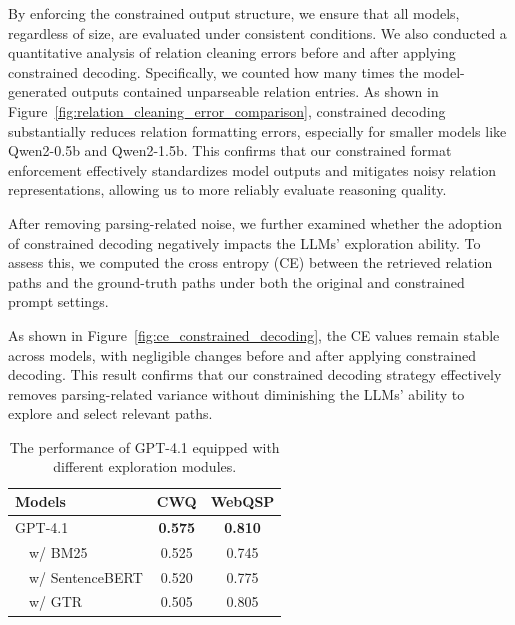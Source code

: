 \documentclass[11pt]{article}
\begin{document}
By enforcing the constrained output structure, we ensure that all models, regardless of size, are evaluated under consistent conditions. We also conducted a quantitative analysis of relation cleaning errors before and after applying constrained decoding. Specifically, we counted how many times the model-generated outputs contained unparseable relation entries. As shown in Figure~\ref{fig:relation_cleaning_error_comparison}, constrained decoding substantially reduces relation formatting errors, especially for smaller models like Qwen2-0.5b and Qwen2-1.5b. This confirms that our constrained format enforcement effectively standardizes model outputs and mitigates noisy relation representations, allowing us to more reliably evaluate reasoning quality.

After removing parsing-related noise, we further examined whether the adoption of constrained decoding negatively impacts the LLMs' exploration ability. To assess this, we computed the cross entropy (CE) between the retrieved relation paths and the ground-truth paths under both the original and constrained prompt settings. 

As shown in Figure~\ref{fig:ce_constrained_decoding}, the CE values remain stable across models, with negligible changes before and after applying constrained decoding. This result confirms that our constrained decoding strategy effectively removes parsing-related variance without diminishing the LLMs’ ability to explore and select relevant paths.

\begin{table}
  \centering
  \begin{tabular}{l|c|c}
    \hline
    Models & CWQ & WebQSP \\
    \hline
    GPT-4.1 & \textbf{0.575} & \textbf{0.810} \\
    $\quad$w/ BM25 & 0.525 & 0.745 \\
    $\quad$w/ SentenceBERT & 0.520 & 0.775 \\
    $\quad$w/ GTR & 0.505 & 0.805 \\ \hline
  \end{tabular}
    \caption{The performance of GPT-4.1 equipped with different exploration modules.}
\label{tab:llm_retrieval}
\end{table}
\end{document}
